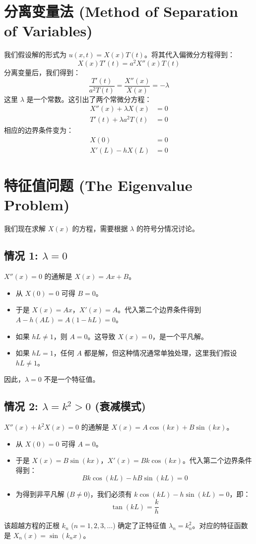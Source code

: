 \documentclass{article}
\begin{document}
	\section{分离变量法 (Method of Separation of Variables)}
	
	我们假设解的形式为 $u(x,t) = X(x)T(t)$。将其代入偏微分方程得到：
	$$
	X(x)T'(t) = a^2 X''(x)T(t)
	$$
	分离变量后，我们得到：
	$$
	\frac{T'(t)}{a^2 T(t)} = \frac{X''(x)}{X(x)} = -\lambda
	$$
	这里 $\lambda$ 是一个常数。这引出了两个常微分方程：
	\begin{align}
		X''(x) + \lambda X(x) &= 0 \label{eq:X} \\
		T'(t) + \lambda a^2 T(t) &= 0 \label{eq:T}
	\end{align}
	相应的边界条件变为：
	\begin{align*}
		X(0) &= 0 \\
		X'(L) - h X(L) &= 0
	\end{align*}
	
	\section{特征值问题 (The Eigenvalue Problem)}
	
	我们现在求解 $X(x)$ 的方程，需要根据 $\lambda$ 的符号分情况讨论。
	
	\subsection{情况 1: $\lambda = 0$}
	$X''(x) = 0$ 的通解是 $X(x) = Ax + B$。
	\begin{itemize}
		\item 从 $X(0)=0$ 可得 $B=0$。
		\item 于是 $X(x) = Ax$，$X'(x)=A$。代入第二个边界条件得到 $A - h(AL) = A(1-hL) = 0$。
		\item 如果 $hL \neq 1$，则 $A=0$。这导致 $X(x)=0$，是一个平凡解。
		\item 如果 $hL = 1$，任何 $A$ 都是解，但这种情况通常单独处理，这里我们假设 $hL \neq 1$。
	\end{itemize}
	因此，$\lambda=0$ 不是一个特征值。
	
	\subsection{情况 2: $\lambda = k^2 > 0$ (衰减模式)}
	$X''(x) + k^2 X(x) = 0$ 的通解是 $X(x) = A\cos(kx) + B\sin(kx)$。
	\begin{itemize}
		\item 从 $X(0)=0$ 可得 $A=0$。
		\item 于是 $X(x) = B\sin(kx)$，$X'(x) = Bk\cos(kx)$。代入第二个边界条件得到：
		$$
		Bk\cos(kL) - hB\sin(kL) = 0
		$$
		\item 为得到非平凡解 ($B \neq 0$)，我们必须有 $k\cos(kL) - h\sin(kL) = 0$，即：
		$$
		\tan(kL) = \frac{k}{h}
		$$
	\end{itemize}
	该超越方程的正根 $k_n$ ($n=1, 2, 3, \dots$) 确定了正特征值 $\lambda_n = k_n^2$。对应的特征函数是 $X_n(x) = \sin(k_n x)$。
	
\end{document}
